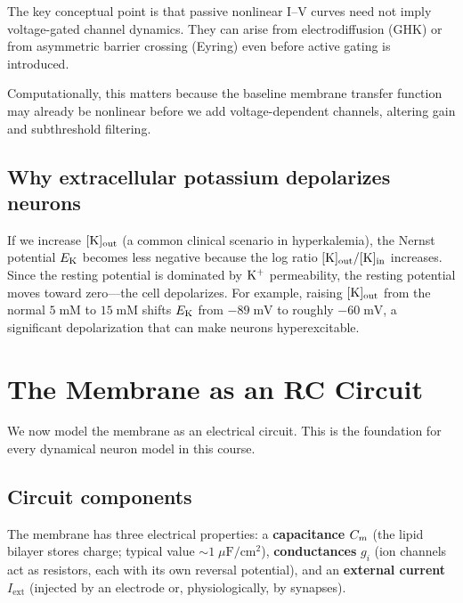 The key conceptual point is that passive nonlinear I--V curves need not imply voltage-gated channel dynamics. They can arise from electrodiffusion (GHK) or from asymmetric barrier crossing (Eyring) even before active gating is introduced.

Computationally, this matters because the baseline membrane transfer function may already be nonlinear before we add voltage-dependent channels, altering gain and subthreshold filtering.

\subsection{Why extracellular potassium depolarizes neurons}

If we increase $[\mathrm{K}]_{\text{out}}$ (a common clinical scenario in hyperkalemia), the Nernst potential $E_{\mathrm{K}}$ becomes less negative because the log ratio $[\mathrm{K}]_{\text{out}}/[\mathrm{K}]_{\text{in}}$ increases. Since the resting potential is dominated by $\mathrm{K}^+$ permeability, the resting potential moves toward zero---the cell depolarizes. For example, raising $[\mathrm{K}]_{\text{out}}$ from the normal $5\;\text{mM}$ to $15\;\text{mM}$ shifts $E_{\mathrm{K}}$ from $-89\;\text{mV}$ to roughly $-60\;\text{mV}$, a significant depolarization that can make neurons hyperexcitable.

\section{The Membrane as an RC Circuit}
\label{sec:rc-circuit}

We now model the membrane as an electrical circuit. This is the foundation for every dynamical neuron model in this course.

\subsection{Circuit components}

The membrane has three electrical properties: a \textbf{capacitance} $C_m$ (the lipid bilayer stores charge; typical value $\sim 1\;\mu\text{F}/\text{cm}^2$), \textbf{conductances} $g_i$ (ion channels act as resistors, each with its own reversal potential), and an \textbf{external current} $I_{\text{ext}}$ (injected by an electrode or, physiologically, by synapses).


